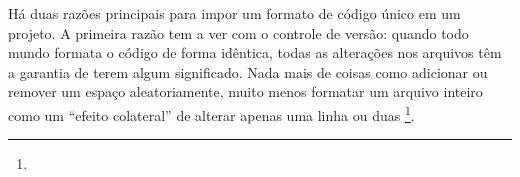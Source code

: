 \begin{citacao}
    Há duas razões principais para impor um formato de código único em um projeto.
    A primeira razão tem a ver com o controle de versão:
    quando todo mundo formata o código de forma idêntica,
    todas as alterações nos arquivos têm a garantia de terem algum significado.
    Nada mais de coisas como adicionar ou
    remover um espaço aleatoriamente,
    muito menos formatar um arquivo inteiro como um ``efeito colateral'' de alterar apenas uma linha ou
    duas \cite[tradução nossa]{Geukens}\footnote{
    }.
\end{citacao}

